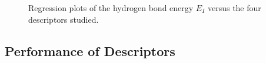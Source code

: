 \documentclass[11pt]{report}
\begin{document}
\begin{figure}
  \hspace{0.01\linewidth}
  \caption[Regression plots]{Regression plots of the hydrogen bond energy $E_{I}$ versus the four descriptors studied.}
  \label{f:HBP-plots}
\end{figure}
\subsection{Performance of Descriptors}
\label{ss:HBP-Res_PerfDesc}
\end{document}
